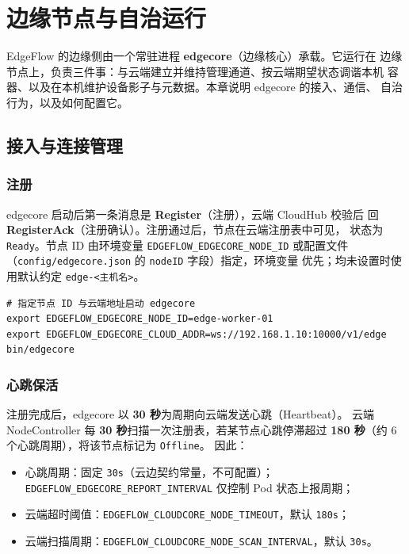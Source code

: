 \chapter{边缘节点与自治运行}
\label{ch:5}

EdgeFlow 的边缘侧由一个常驻进程 \textbf{edgecore}（边缘核心）承载。它运行在
边缘节点上，负责三件事：与云端建立并维持管理通道、按云端期望状态调谐本机
容器、以及在本机维护设备影子与元数据。本章说明 edgecore 的接入、通信、
自治行为，以及如何配置它。

\section{接入与连接管理}

\subsection{注册}

edgecore 启动后第一条消息是 \textbf{Register}（注册），云端 CloudHub 校验后
回 \textbf{RegisterAck}（注册确认）。注册通过后，节点在云端注册表中可见，
状态为 \texttt{Ready}。节点 ID 由环境变量 \texttt{EDGEFLOW\_EDGECORE\_NODE\_ID}
或配置文件（\texttt{config/edgecore.json} 的 \texttt{nodeID} 字段）指定，环境变量
优先；均未设置时使用默认约定 \texttt{edge-\allowbreak<主机名>}。

\begin{lstlisting}
# 指定节点 ID 与云端地址启动 edgecore
export EDGEFLOW_EDGECORE_NODE_ID=edge-worker-01
export EDGEFLOW_EDGECORE_CLOUD_ADDR=ws://192.168.1.10:10000/v1/edge
bin/edgecore
\end{lstlisting}

\subsection{心跳保活}

注册完成后，edgecore 以 \textbf{30 秒}为周期向云端发送心跳（Heartbeat）。
云端 NodeController 每 \textbf{30 秒}扫描一次注册表，若某节点心跳停滞超过
\textbf{180 秒}（约 6 个心跳周期），将该节点标记为 \texttt{Offline}。
因此：

\begin{itemize}
  \item 心跳周期：固定 \texttt{30s}（云边契约常量，不可配置）；\texttt{EDGEFLOW\_EDGECORE\_REPORT\_INTERVAL} 仅控制 Pod 状态上报周期；
  \item 云端超时阈值：\texttt{EDGEFLOW\_CLOUDCORE\_NODE\_TIMEOUT}，默认 \texttt{180s}；
  \item 云端扫描周期：\texttt{EDGEFLOW\_CLOUDCORE\_NODE\_SCAN\_INTERVAL}，默认 \texttt{30s}。
\end{itemize}

